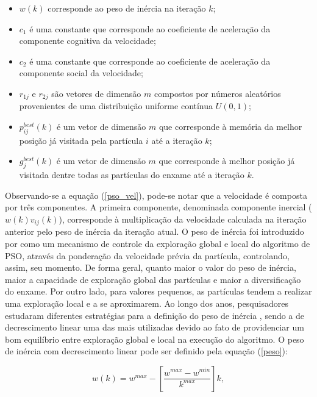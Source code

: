 \documentclass[
	12pt,				%
	openany,			%
	twoside,			%
	a4paper,			%
	chapter=TITLE,		%
	section=Title,		%
	subsection=Title,	%
	subsubsection=Title,%
	english,			%
	french,				%
	spanish,			%
	brazil			%
	]{abntex2}
\begin{document}
\begin{ERRATA}
\begin{itemize}
    \item $w(k)$ corresponde ao peso de inércia na iteração $k$;
    \item $c_1$ é uma constante que corresponde ao coeficiente de aceleração da componente cognitiva da velocidade;
    \item $c_2$ é uma constante que corresponde ao coeficiente de aceleração da componente social da velocidade;
    \item $r_{1j}$ e $r_{2j}$ são vetores de dimensão $m$ compostos por números aleatórios provenientes de uma distribuição uniforme contínua $U(0,1)$;
    \item $p^{best}_{ij}(k)$ é um vetor de dimensão $m$ que corresponde à memória da melhor posição já visitada pela partícula $i$ até a iteração $k$;
    \item $g^{best}_{j}(k)$ é um vetor de dimensão $m$ que corresponde à melhor posição já visitada dentre todas as partículas do enxame até a iteração $k$.
    
\end{itemize}

Observando-se a equação (\ref{pso_vel}), pode-se notar que a velocidade é composta por três componentes. A primeira componente, denominada componente inercial ($w(k)v_{ij}(k)$), corresponde à multiplicação da velocidade calculada na iteração anterior pelo peso de inércia da iteração atual. O peso de inércia foi introduzido por  como um mecanismo de controle da exploração global e local do algoritmo de PSO, através da ponderação da velocidade prévia da partícula, controlando, assim, seu momento. De forma geral, quanto maior o valor do peso de inércia, maior a capacidade de exploração global das partículas e maior a diversificação do enxame. Por outro lado, para valores pequenos, as partículas tendem a realizar uma exploração local e a se aproximarem. Ao longo dos anos, pesquisadores estudaram diferentes estratégias para a definição do peso de inércia \cite{pesoineq, fuzzyshi}, sendo a de decrescimento linear uma das mais utilizadas devido ao fato de providenciar um bom equilíbrio entre exploração global e local na execução do algoritmo. O peso de inércia com decrescimento linear pode ser definido pela equação (\ref{peso}):

\begin{equation} \label{peso}
w(k) = w^{max} - \left[\frac{w^{max}-w^{min}}{k^{max}}\right]k,
\end{equation}


\end{ERRATA}
\end{document}
